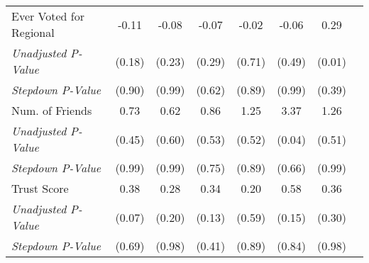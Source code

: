 \begin{tabular}{l c c c c c c c}
Ever Voted for Regional & -0.11 & -0.08 & -0.07 & -0.02 & -0.06 & 0.29 \\
\quad \textit{Unadjusted P-Value} & (0.18) & (0.23) & (0.29) & (0.71) & (0.49) & (0.01) \\
\quad \textit{Stepdown P-Value} & (0.90) & (0.99) & (0.62) & (0.89) & (0.99) & (0.39) \\
Num. of Friends & 0.73 & 0.62 & 0.86 & 1.25 & 3.37 & 1.26 \\
\quad \textit{Unadjusted P-Value} & (0.45) & (0.60) & (0.53) & (0.52) & (0.04) & (0.51) \\
\quad \textit{Stepdown P-Value} & (0.99) & (0.99) & (0.75) & (0.89) & (0.66) & (0.99) \\
Trust Score & 0.38 & 0.28 & 0.34 & 0.20 & 0.58 & 0.36 \\
\quad \textit{Unadjusted P-Value} & (0.07) & (0.20) & (0.13) & (0.59) & (0.15) & (0.30) \\
\quad \textit{Stepdown P-Value} & (0.69) & (0.98) & (0.41) & (0.89) & (0.84) & (0.98) \\
\bottomrule
\end{tabular}
